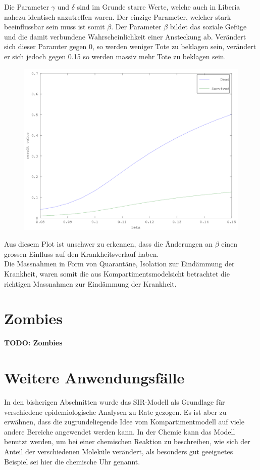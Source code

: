 \begin{refsection}
Die Parameter $\gamma$ und $\delta$ sind im Grunde starre Werte, welche auch in Liberia nahezu identisch anzutreffen waren. Der einzige Parameter, welcher stark beeinflussbar sein muss ist somit $\beta$. Der Parameter $\beta$ bildet das soziale Gefüge und die damit verbundene Wahrscheinlichkeit einer Ansteckung ab. Verändert sich dieser Paramter gegen 0, so werden weniger Tote zu beklagen sein, verändert er sich jedoch gegen 0.15 so werden massiv mehr Tote zu beklagen sein.
\begin{figure}[H]
	\centering
	\includegraphics[width=1\textwidth]{sir/beta_change_det.png}
\end{figure}
Aus diesem Plot ist unschwer zu erkennen, dass die Änderungen an $\beta$ einen grossen Einfluss auf den Krankheitsverlauf haben.
\\
Die Massnahmen in Form von Quarantäne, Isolation zur Eindämmung der Krankheit, waren somit die aus Kompartimentsmodelsicht betrachtet die richtigen Massnahmen zur Eindämmung der Krankheit.

\section{Zombies}
\textbf{TODO: Zombies}

\section{Weitere Anwendungsfälle}
In den bisherigen Abschnitten wurde das SIR-Modell als Grundlage für verschiedene epidemiologische Analysen zu Rate gezogen.
Es ist aber zu erwähnen, dass die zugrundeliegende Idee vom Kompartimentmodell auf viele andere Bereiche angewendet werden kann.
In der Chemie kann das Modell benutzt werden, um bei einer chemischen Reaktion zu beschreiben, wie sich der Anteil der verschiedenen Moleküle verändert, als besonders gut geeignetes Beispiel sei hier die chemische Uhr genannt.


\end{refsection}
